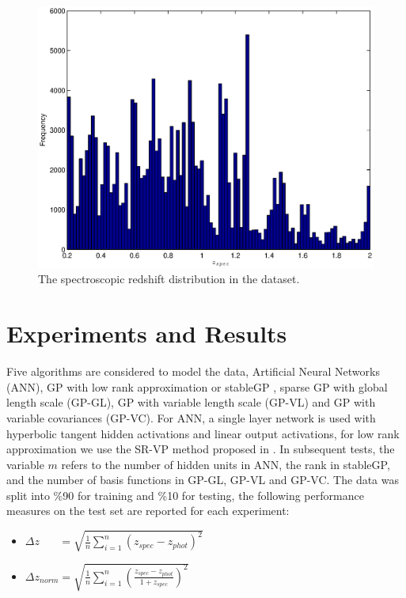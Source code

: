 \documentclass[useAMS,usenatbib,fleqn]{mn2e}
\begin{document}
\begin{figure}
       \centering
       \includegraphics[width=\columnwidth]{figures/zspec.eps}
        \caption{The spectroscopic redshift distribution in the dataset.}
       \label{fig-zspec-hostogram}
\end{figure}

\section{Experiments and Results}
\label{sec-experiments}

Five algorithms are considered to model the data, Artificial Neural Networks (ANN), GP with low rank approximation or stableGP , sparse GP with global length scale (GP-GL), GP with variable length scale (GP-VL) and  GP with variable covariances (GP-VC). For ANN, a single layer network is used with hyperbolic tangent hidden activations and linear output activations, for low rank approximation we use the SR-VP method proposed in \citep{foster2009}. In subsequent tests, the variable $m$ refers to the number of hidden units in ANN, the rank in stableGP, and the number of basis functions in GP-GL, GP-VL and GP-VC. The data was split into \%90 for training and \%10 for testing, the following performance measures on the test set are reported for each experiment:

\begin{itemize}
  \item $\Delta z_{\phantom{norm}} = \sqrt{\frac{1}{n}\sum_{i=1}^{n}\left(z_{spec}-z_{phot}\right)^{2}}$
  \item $\Delta z_{norm} = \sqrt{\frac{1}{n}\sum_{i=1}^{n}\left(\frac{z_{spec}-z_{phot}}{1+z_{spec}}\right)^{2}}$
\end{itemize}
\end{document}
